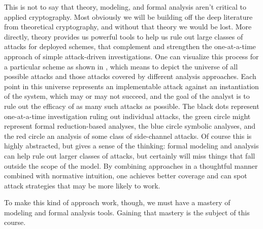 This is not to say that theory, modeling, and formal analysis aren't critical to
applied cryptography. Most obviously we will be building off the deep literature
from theoretical cryptography, and without that theory we would be lost. More
directly, theory provides us powerful tools to help us rule out large
classes of attacks for deployed schemes, that complement and strengthen the one-at-a-time
approach of simple attack-driven investigations. 
One can visualize this process for a particular
scheme as shown in , which means to depict the universe of all
possible attacks and those attacks covered by different analysis approaches. Each point in
this universe represents an implementable attack against an instantiation 
of the system, which may or may not succeed, and the goal of the analyst is to rule out
the efficacy of as many such attacks as possible.  The black dots
represent one-at-a-time investigation ruling out individual attacks, the
green circle might represent formal reduction-based analyses, the blue circle
symbolic analyses, and the red circle an analysis of some class of side-channel
attacks.  Of course this is highly abstracted, but gives a sense of the
thinking: formal modeling and analysis can help rule out larger classes of
attacks, but certainly will miss things that fall outside the scope of the
model. By combining approaches in a thoughtful manner combined with normative
intuition, one achieves better coverage and can spot attack strategies that may
be more likely to work.

To make this kind of approach work, though, we must have a mastery of modeling
and formal analysis tools. Gaining that mastery is the subject of this course.





